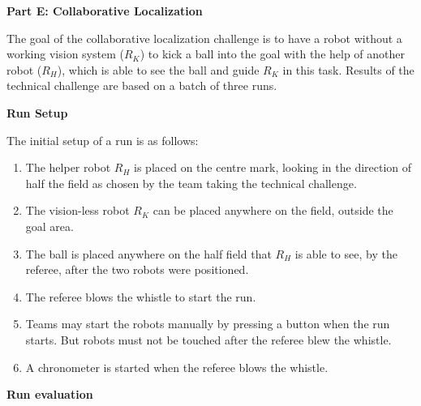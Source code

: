 \clearpage
\sffamily
{\bfseries\color[rgb]{0.4,0.4,0.4} Part E: Collaborative Localization}
{}


\bigskip

The goal of the collaborative localization challenge is to have a  robot without a working vision system ($R_K$) to kick a ball
into the goal with the help of another robot ($R_H$), which is able to see the ball and guide $R_K$ in this task. Results of the technical challenge are based on a batch of three runs.

\bigskip

{\bfseries Run Setup}

\smallskip


The initial setup of a run is as follows:

\begin{enumerate}

\item The helper robot $R_H$ is placed on the centre mark, looking in the direction of half the field as chosen by the team taking the technical challenge.

\item The vision-less robot $R_K$ can be placed anywhere on the field, outside the goal area.

\item The ball is placed anywhere on the half field that $R_H$ is able to see, by the referee, after the two robots were positioned.

\item The referee blows the whistle to start the run.

\item Teams may start the robots manually by pressing a button when the run starts. But robots must not be touched after the referee blew the whistle. 

\item A chronometer is started when the referee blows the whistle.
\end{enumerate}

{\bfseries Run evaluation}

\smallskip


